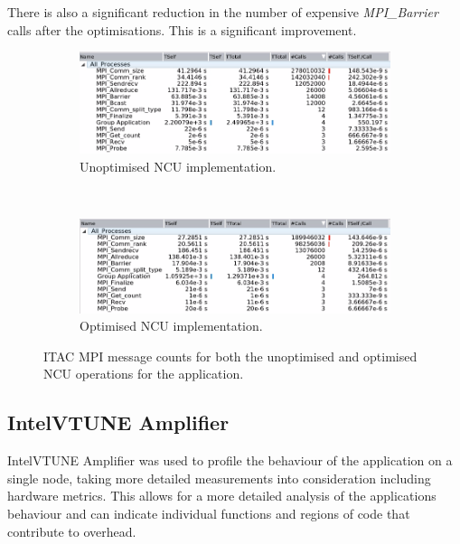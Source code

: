 There is also a significant reduction in the number of expensive \textit{MPI\_Barrier} calls after the optimisations. This is a significant improvement.

\begin{figure}[H]%
    \centering
    \begin{subfigure}{1.\linewidth}
        \centering
        \includegraphics[width=1.\linewidth]{Images/MPI_message_counts/orig_message_counts.png}
		\caption{Unoptimised NCU implementation.}
        \label{fig:itac_counts_unopt_ncu}
    \end{subfigure}\\
    \begin{subfigure}{1.\linewidth}
        \centering
        \includegraphics[width=1.\linewidth]{Images/MPI_message_counts/ncu_message_counts.png}
		\caption{Optimised NCU implementation.}
        \label{fig:itac_counts_opt_ncu}
    \end{subfigure}
    \caption{ITAC MPI message counts for both the unoptimised and optimised NCU operations for the application.}
        \label{fig:itac_counts}
\end{figure}

\subsection{Intel\textregistered VTUNE Amplifier}
Intel\textregistered VTUNE Amplifier was used to profile the behaviour of the application on a single node, taking more detailed measurements into consideration including hardware metrics. This allows for a more detailed analysis of the applications behaviour and can indicate individual functions and regions of code that contribute to overhead.

